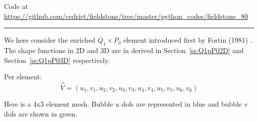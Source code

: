

\begin{center}
Code at \url{https://github.com/cedrict/fieldstone/tree/master/python_codes/fieldstone_80}
\end{center}

\par\noindent\rule{\textwidth}{0.4pt}

We here consider the enriched $Q_1\times P_0$ element introduced first by Fortin (1981) \cite{fort81}.
The shape functions in 2D and 3D are in derived in Section~\ref{ss:Q1pP02D} and Section~\ref{ss:Q1pP03D} respectively.


Per element:
\[
\vec{V} = (u_1,v_1,u_2,v_2,u_3,v_3,u_4,v_4,u_5,v_5,u_6,v_6)
\]

Here is a 4x3 element mesh. Bubble $u$ dofs are represented in blue and bubble $v$ dofs are shown in green.


